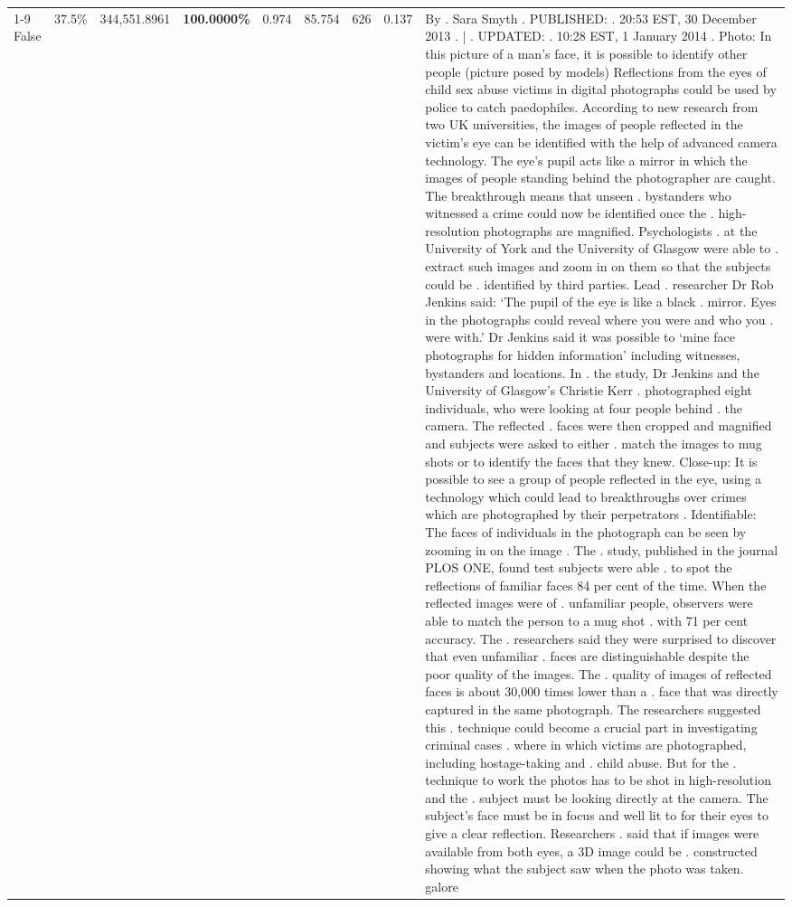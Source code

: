 \begin{table}[H]
\begin{tabular}{lllrlllll}
\cline{1-9} \cline{2-9}
False & 37.5\% & 344,551.8961 & \bfseries \color{red} 100.0000\% & 0.974 & 85.754 & 626 & 0.137 & By . Sara Smyth . PUBLISHED: . 20:53 EST, 30 December 2013 . | . UPDATED: . 10:28 EST, 1 January 2014 . Photo: In this picture of a man's face, it is possible to identify other people (picture posed by models) Reflections from the eyes of child sex abuse victims in digital photographs could be used by police to catch paedophiles. According to new research from two UK universities, the images of people reflected in the victim's eye can be identified with the help of advanced camera technology. The eye's pupil acts like a mirror in which the images of people standing behind the photographer are caught. The breakthrough means that unseen . bystanders who witnessed a crime could now be identified once the . high-resolution photographs are magnified. Psychologists . at the University of York and the University of Glasgow were able to . extract such images and zoom in on them so that the subjects could be . identified by third parties. Lead . researcher Dr Rob Jenkins said: ‘The pupil of the eye is like a black . mirror. Eyes in the photographs could reveal where you were and who you . were with.' Dr Jenkins said it was possible to ‘mine face photographs for hidden information' including witnesses, bystanders and locations. In . the study, Dr Jenkins and the University of Glasgow's Christie Kerr . photographed eight individuals, who were looking at four people behind . the camera. The reflected . faces were then cropped and magnified and subjects were asked to either . match the images to mug shots or to identify the faces that they knew. Close-up: It is possible to see a group of people reflected in the eye, using a technology which could lead to breakthroughs over crimes which are photographed by their perpetrators . Identifiable: The faces of individuals in the photograph can be seen by zooming in on the image . The . study, published in the journal PLOS ONE, found test subjects were able . to spot the reflections of familiar faces 84 per cent of the time. When the reflected images were of . unfamiliar people, observers were able to match the person to a mug shot . with 71 per cent accuracy. The . researchers said they were surprised to discover that even unfamiliar . faces are distinguishable despite the poor quality of the images. The . quality of images of reflected faces is about 30,000 times lower than a . face that was directly captured in the same photograph. The researchers suggested this . technique could become a crucial part in investigating criminal cases . where in which victims are photographed, including hostage-taking and . child abuse. But for the . technique to work the photos has to be shot in high-resolution and the . subject must be looking directly at the camera. The subject's face must be in focus and well lit to for their eyes to give a clear reflection. Researchers . said that if images were available from both eyes, a 3D image could be . constructed showing what the subject saw when the photo was taken. galore \\

\end{tabular}
\end{table}
